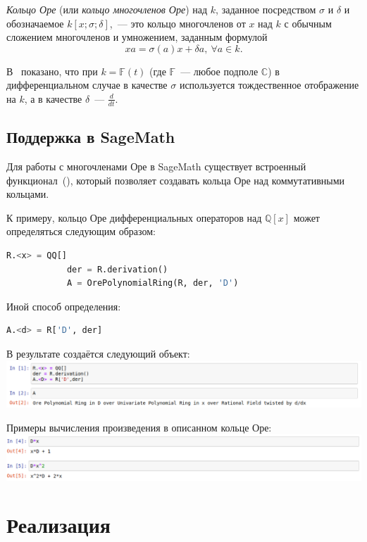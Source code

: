         \emph{Кольцо Оре} (или \emph{кольцо многочленов Оре}) над $k$, заданное посредством
        $\sigma$ и $\delta$ и обозначаемое $k[x;\sigma;\delta]$,~--- это кольцо
        многочленов от $x$ над $k$ с обычным сложением многочленов и умножением, 
        заданным формулой
            $$xa=\sigma(a)x+\delta a,~\forall a \in k.$$


        В~\cite{ore_abr} показано, что при $k=\mathbb{F}(t)$ (где $\mathbb{F}$~--- 
        любое подполе $\mathbb{C}$) в дифференциальном случае в качестве $\sigma$ 
        используется тождественное отображение на $k$, а в качестве $\delta$~--- 
        $\frac{d}{dt}$.
    \subsection{Поддержка в SageMath}
        Для работы с многочленами Оре в SageMath существует встроенный 
        функционал~(\cite{sage_ore}), который позволяет создавать кольца Оре над 
        коммутативными кольцами.


        К примеру, кольцо Оре дифференциальных операторов над $\mathbb{Q}[x]$ может 
        определяться следующим образом:
        \begin{lstlisting}[language=python]
            R.<x> = QQ[]
            der = R.derivation()
            A = OrePolynomialRing(R, der, 'D')
        \end{lstlisting}
        Иной способ определения:
        \begin{lstlisting}[language=python]
            A.<d> = R['D', der]
        \end{lstlisting}


        В результате создаётся следующий объект: \\
        \includegraphics[width=\textwidth]{example1.png}


        Примеры вычисления произведения в описанном кольце Оре: \\
        \includegraphics[width=\textwidth]{example2.png}

\newpage
\section{Реализация}
